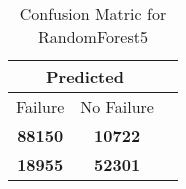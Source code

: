 \begin{table}[] 
\caption{Confusion Matric for RandomForest5} 
\label{Table: Prediction Accuracy-DMDRandomForest5OnlySunEKF-ignoreReflectionEKF-top2-Reflection} 
\centering 
\begin{tabular} 
 {@{}ccc@{}} 
\toprule 
\multicolumn{2}{c}{\textbf{Predicted}}
 \\ \midrule 
\multicolumn{1}{|c|}{Failure} & 
\multicolumn{1}{c|}{No Failure}
 \\ \midrule 
\multicolumn{1}{|c|}{\color{green}\textbf{88150}} & 
\multicolumn{1}{c|}{\color{red}\textbf{10722}}
 \\ \midrule 
\multicolumn{1}{|c|}{\color{red}\textbf{18955}} & 
\multicolumn{1}{c|}{\color{green}\textbf{52301}}
 \\ \bottomrule 
\end{tabular} 
\end{table} 
